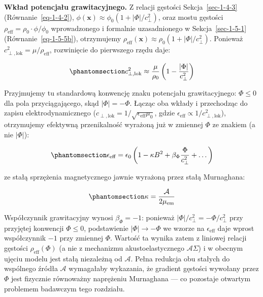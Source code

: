 \documentclass[
  polish,
  letterpaper,
  DIV=11,
  numbers=noendperiod,
  oneside]{scrartcl}
\begin{document}
\textbf{Wkład potencjału grawitacyjnego.} Z relacji gęstości
Sekcja~\ref{sec-1-4-3} (Równanie~\ref{eq-1-4-2}),
\(\phi(\mathbf{x})\approx\phi_0(1+|\Phi|/c_\perp^2)\), oraz mostu
gęstości \(\rho_{\text{eff}}=\rho_0\cdot\phi/\phi_0\) wprowadzonego i
formalnie uzasadnionego w Sekcja~\ref{sec-1-5-1}
(Równanie~\ref{eq-1-5-5b}), otrzymujemy
\(\rho_{\text{eff}}(\mathbf{x})\approx\rho_0(1+|\Phi|/c_\perp^2)\).
Ponieważ \(c_{\perp,\text{lok}}^2=\mu/\rho_{\text{eff}}\), rozwinięcie
do pierwszego rzędu daje:

\begin{equation}\protect\phantomsection\label{eq-1-4-5-wz2}{c_{\perp,\text{lok}}^2 \approx \frac{\mu}{\rho_0}\left(1 - \frac{|\Phi|}{c_\perp^2}\right)}\end{equation}

Przyjmujemy tu standardową konwencję znaku potencjału grawitacyjnego:
\(\Phi\le0\) dla pola przyciągającego, skąd \(|\Phi|=-\Phi\). Łącząc oba
wkłady i przechodząc do zapisu elektrodynamicznego
(\(c_{\perp,\text{lok}}=1/\sqrt{\epsilon_{\text{eff}}\mu_0}\), gdzie
\(\epsilon_{\text{eff}}\propto 1/c_{\perp,\text{lok}}^2\)), otrzymujemy
efektywną przenikalność wyrażoną już w zmiennej \(\Phi\) ze znakiem (a
nie \(|\Phi|\)):

\begin{equation}\protect\phantomsection\label{eq-1-4-5-wz3}{\epsilon_{\text{eff}} = \epsilon_0 \left(1 - \kappa B^2 + \beta_\Phi \frac{\Phi}{c_{\perp}^2} + \dots\right)}\end{equation}

ze stałą sprzężenia magnetycznego jawnie wyrażoną przez stałą
Murnaghana:

\begin{equation}\protect\phantomsection\label{eq-1-4-5-wz4}{\kappa = \frac{\mathcal{A}}{2\mu_\text{em}}}\end{equation}

Współczynnik grawitacyjny wynosi \(\beta_\Phi=-1\): ponieważ
\(|\Phi|/c_\perp^2=-\Phi/c_\perp^2\) przy przyjętej konwencji
\(\Phi\le0\), podstawienie \(|\Phi|\to-\Phi\) we wzorze na
\(\epsilon_{\text{eff}}\) daje wprost współczynnik \(-1\) przy zmiennej
\(\Phi\). Wartość ta wynika zatem z liniowej relacji gęstości
\(\rho_{\text{eff}}(\Phi)\) (a nie z mechanizmu akustoelastycznego
\(\mathcal{A}\Sigma\)) i w obecnym ujęciu modelu jest stałą niezależną
od \(\mathcal{A}\). Pełna redukcja obu stałych do wspólnego źródła
\(\mathcal{A}\) wymagałaby wykazania, że gradient gęstości wywołany
przez \(\Phi\) jest fizycznie równoważny naprężeniu Murnaghana --- co
pozostaje otwartym problemem badawczym tego rozdziału.
\end{document}
